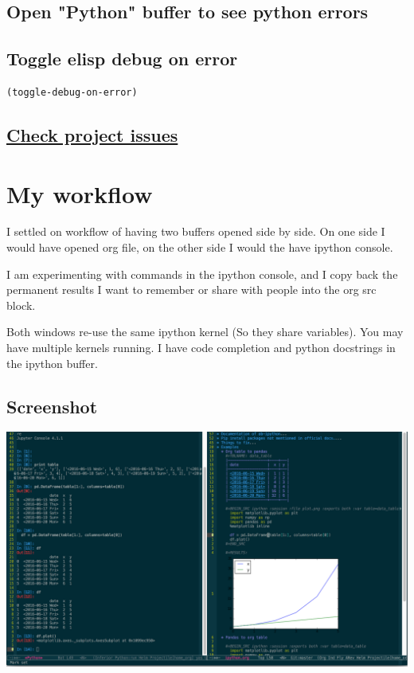 \documentclass[11pt]{article}
\begin{document}
\subsection{Open "Python" buffer to see python errors}
\label{sec:orgheadline35}
\subsection{Toggle elisp debug on error}
\label{sec:orgheadline36}
\begin{verbatim}
(toggle-debug-on-error)
\end{verbatim}
\subsection{\href{https://github.com/gregsexton/ob-ipython/issues}{Check project issues}}
\label{sec:orgheadline37}
\section{My workflow}
\label{sec:orgheadline41}
I settled on workflow of having two buffers opened side by side.
On one side I would have opened org file, on the other side I would the have ipython console.

I am experimenting with commands in the ipython console, and I copy back the permanent results I want to
remember or share with people into the org src block.

Both windows re-use the same ipython kernel (So they share variables). You may have multiple kernels running.
I have code completion and python docstrings in the ipython buffer.
\subsection{Screenshot}
\label{sec:orgheadline2}
\includegraphics[width=.9\linewidth]{ob-ipython.png}
\end{document}
